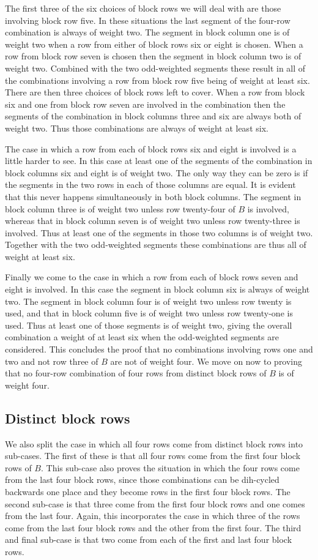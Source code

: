 The first three of the six choices of block rows we will deal with are those involving block row five.
In these situations the last segment of the four-row combination is always of weight two.
The segment in block column one is of weight two when a row from either of block rows six or eight is chosen.
When a row from block row seven is chosen then the segment in block column two is of weight two.
Combined with the two odd-weighted segments these result in all of the combinations involving a row from block row five being of weight at least six.
There are then three choices of block rows left to cover.
When a row from block six and one from block row seven are involved in the combination then the segments of the combination in block columns three and six are always both of weight two.
Thus those combinations are always of weight at least six.

The case in which a row from each of block rows six and eight is involved is a little harder to see.
In this case at least one of the segments of the combination in block columns six and eight is of weight two.
The only way they can be zero is if the segments in the two rows in each of those columns are equal.
It is evident that this never happens simultaneously in both block columns.
The segment in block column three is of weight two unless row twenty-four of $B$ is involved, whereas that in block column seven is of weight two unless row twenty-three is involved.
Thus at least one of the segments in those two columns is of weight two.
Together with the two odd-weighted segments these combinations are thus all of weight at least six.

Finally we come to the case in which a row from each of block rows seven and eight is involved.
In this case the segment in block column six is always of weight two.
The segment in block column four is of weight two unless row twenty is used, and that in block column five is of weight two unless row twenty-one is used.
Thus at least one of those segments is of weight two, giving the overall combination a weight of at least six when the odd-weighted segments are considered.
This concludes the proof that no combinations involving rows one and two and not row three of $B$ are not of weight four.
We move on now to proving that no four-row combination of four rows from distinct block rows of $B$ is of weight four.

\subsection{Distinct block rows}
We also split the case in which all four rows come from distinct block rows into sub-cases.
The first of these is that all four rows come from the first four block rows of $B$.
This sub-case also proves the situation in which the four rows come from the last four block rows, since those combinations can be dih-cycled backwards one place and they become rows in the first four block rows.
The second sub-case is that three come from the first four block rows and one comes from the last four.
Again, this incorporates the case in which three of the rows come from the last four block rows and the other from the first four.
The third and final sub-case is that two come from each of the first and last four block rows.

